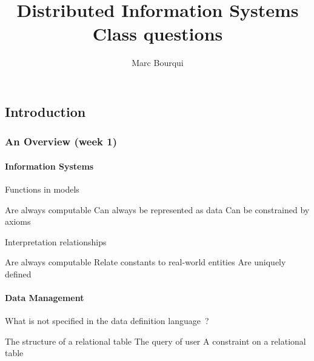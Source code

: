 \documentclass[12pt,a4paper,answers]{exam} %
\author{Marc Bourqui}
\title{Distributed Information Systems\\Class questions}
\begin{document}
\maketitle
\setlength{\headsep}{0.3cm}
\begin{flushleft}

\raggedright
\footnotesize
\sffamily

\begin{multicols*}{2}

\setlength{\premulticols}{1pt}
\setlength{\postmulticols}{1pt}
\setlength{\multicolsep}{1pt}
\setlength{\columnsep}{2cm}

\begin{questions}
\part{Introduction}
\section{An Overview (week 1)}
\subsection{Information Systems}

\question Functions in models
\begin{checkboxes}
\choice Are always computable
\choice Can always be represented as data
\choice Can be constrained by axioms
\end{checkboxes}

\question Interpretation relationships
\begin{checkboxes}
\choice Are always computable
\choice Relate constants to real-world entities
\choice Are uniquely defined
\end{checkboxes}

\subsection{Data Management}

\question What is not specified in the data definition language~?
\begin{checkboxes}
\choice The structure of a relational table
\choice The query of user
\choice A constraint on a relational table
\end{checkboxes}


\end{questions}
\end{multicols*}
\end{flushleft}
\end{document}
